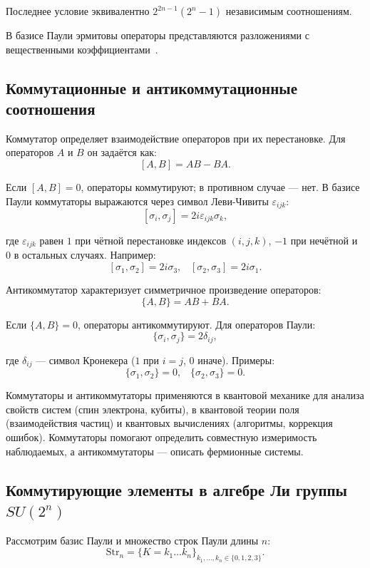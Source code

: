 \documentclass[a4paper]{report}
\begin{document}
Последнее условие эквивалентно ${2^{2n-1}(2^n-1)}$ независимым соотношениям.

В базисе Паули эрмитовы операторы представляются разложениями с вещественными коэффициентами~\cite{Nilsen2006, Tsirulev2020}.


\subsection{Коммутационные и антикоммутационные соотношения}

Коммутатор определяет взаимодействие операторов при их перестановке. Для операторов ${A}$ и ${B}$ он задаётся как:
$${[A, B] = AB - BA.}$$

\noindent Если ${[A, B] = 0}$, операторы коммутируют; в противном случае — нет. В базисе Паули коммутаторы выражаются через символ Леви-Чивиты ${\varepsilon_{ijk}}$:
$${[\sigma_i, \sigma_j] = 2i\varepsilon_{ijk}\sigma_k,}$$

\noindent где ${\varepsilon_{ijk}}$ равен $1$ при чётной перестановке индексов ${(i,j,k)}$, $-1$ при нечётной и $0$ в остальных случаях. Например:
$${[\sigma_1, \sigma_2] = 2i\sigma_3,\;\;\; [\sigma_2, \sigma_3] = 2i\sigma_1.}$$

Антикоммутатор характеризует симметричное произведение операторов:
$${\{A, B\} = AB + BA.}$$

\noindent Если ${\{A, B\} = 0}$, операторы антикоммутируют. Для операторов Паули:
$${\{\sigma_i, \sigma_j\} = 2\delta_{ij},}$$

\noindent где ${\delta_{ij}}$ — символ Кронекера ($1$ при ${i = j}$, $0$ иначе). Примеры:
$${\{\sigma_1, \sigma_2\} = 0,\;\;\; \{\sigma_2, \sigma_3\} = 0.}$$

Коммутаторы и антикоммутаторы применяются в квантовой механике для анализа свойств систем (спин электрона, кубиты), в квантовой теории поля (взаимодействия частиц) и квантовых вычислениях (алгоритмы, коррекция ошибок). Коммутаторы помогают определить совместную измеримость наблюдаемых, а антикоммутаторы — описать фермионные системы.


\subsection{Коммутирующие элементы в алгебре Ли группы ${SU(2^{n})}$}

Рассмотрим базис Паули и множество строк Паули длины ${n}$:
$${
    \mathrm{Str}_n = \{K = k_1\ldots k_n\}_{k_1,\ldots,k_n \in \{0,1,2,3\}}.
}$$
\end{document}
